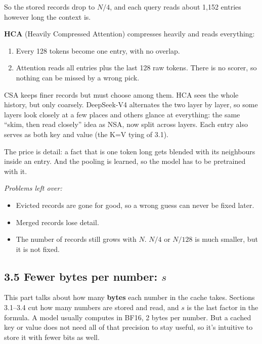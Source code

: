 \documentclass[11pt]{article}
\providecommand{\tightlist}{\setlength{\itemsep}{0pt}\setlength{\parskip}{0pt}}
\begin{document}
So the stored records drop to \(N/4\), and each query reads about 1,152 entries however long the context is.

\textbf{HCA} (Heavily Compressed Attention) compresses heavily and reads everything:

\begin{enumerate}
\def\labelenumi{\arabic{enumi}.}
\tightlist
\item
  Every 128 tokens become one entry, with no overlap.
\item
  Attention reads all entries plus the last 128 raw tokens. There is no scorer, so nothing can be missed by a wrong pick.
\end{enumerate}

CSA keeps finer records but must choose among them. HCA sees the whole history, but only coarsely. DeepSeek-V4 alternates the two layer by layer, so some layers look closely at a few places and others glance at everything: the same ``skim, then read closely'' idea as NSA, now split across layers. Each entry also serves as both key and value (the K=V tying of 3.1).

The price is detail: a fact that is one token long gets blended with its neighbours inside an entry. And the pooling is learned, so the model has to be pretrained with it.

\emph{Problems left over:}

\begin{itemize}
\tightlist
\item
  Evicted records are gone for good, so a wrong guess can never be fixed later.
\item
  Merged records lose detail.
\item
  The number of records still grows with \(N\). \(N/4\) or \(N/128\) is much smaller, but it is not fixed.
\end{itemize}

\subsection{\texorpdfstring{3.5 Fewer bytes per number: \(s\)}{3.5 Fewer bytes per number: s}}

This part talks about how many \textbf{bytes} each number in the cache takes. Sections 3.1--3.4 cut how many numbers are stored and read, and \(s\) is the last factor in the formula. A model usually computes in BF16, 2 bytes per number. But a cached key or value does not need all of that precision to stay useful, so it's intuitive to store it with fewer bits as well.
\end{document}
